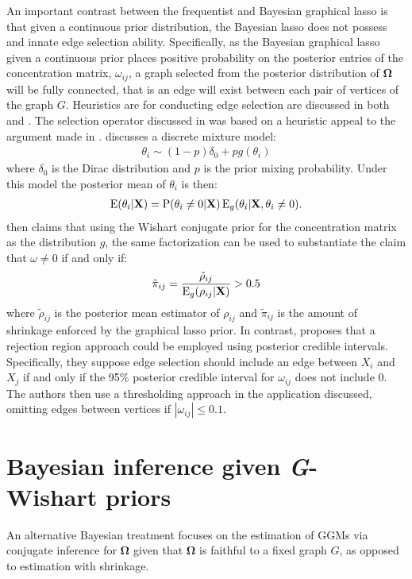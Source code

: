 An important contrast between the frequentist and Bayesian graphical lasso is that given a continuous prior distribution, the Bayesian lasso does not possess and innate edge selection ability. Specifically, as the Bayesian graphical lasso given a continuous prior places positive probability on the posterior entries of the concentration matrix, $\omega_{ij}$, a graph selected from the posterior distribution of $\boldsymbol{\Omega}$ will be fully connected, that is an edge will exist between each pair of vertices of the graph $G$. Heuristics are for conducting edge selection are discussed in both \cite{wang2012}  and \cite{peterson2013}. The selection operator discussed in \cite{wang2012} was based on a heuristic appeal to the argument made in \cite{carvalho2010}.  \cite{carvalho2010} discusses a discrete mixture model:
\begin{align}
\theta_i \sim (1-p)\delta_0 + pg(\theta_i)
\end{align}
where $\delta_0$ is the Dirac distribution and $p$ is the prior mixing probability. Under this model the posterior mean of $\theta_i$ is then:
\begin{align}
\operatorname{E}(\theta_i|\textbf{X})=\operatorname{P}(\theta_i\neq 0|\textbf{X})\operatorname{E}_g(\theta_i|\textbf{X},\theta_i\neq 0).
\end{align}
\cite{wang2012} then claims that using the Wishart conjugate prior for the concentration matrix as the distribution $g$, the same factorization can be used to substantiate the claim that $\omega \neq 0$ if and only if:
\begin{align}
\tilde{\pi}_{ij}=\frac{\tilde{\rho}_{ij}}{\operatorname{E}_g(\rho_{ij}|\textbf{X})}>0.5
\end{align}
where $\tilde{\rho}_{ij}$ is the posterior mean estimator of $\rho_{ij}$ and $\tilde{\pi}_{ij}$ is the amount of shrinkage enforced by the graphical lasso prior. In contrast, \cite{peterson2013} proposes that a rejection region approach could be employed using posterior credible intervals. Specifically, they suppose edge selection should include an edge between $X_i$ and $X_j$ if and only if the 95\% posterior credible interval for $\omega_{ij}$ does not include 0. The authors then use a thresholding approach in the application discussed, omitting edges between vertices if $|\omega_{ij}|\leq 0.1$.

\section{Bayesian inference given \emph{G}-Wishart priors}
An alternative Bayesian treatment focuses on  \cite{dawid1993,roverato2002,atay2005,dobra2011a,dobra2011b,wang2012,cheng2012} the estimation of GGMs via conjugate inference for $\boldsymbol{\Omega}$ given that $\boldsymbol{\Omega}$ is faithful to a fixed graph $G$, as opposed to estimation with shrinkage.

